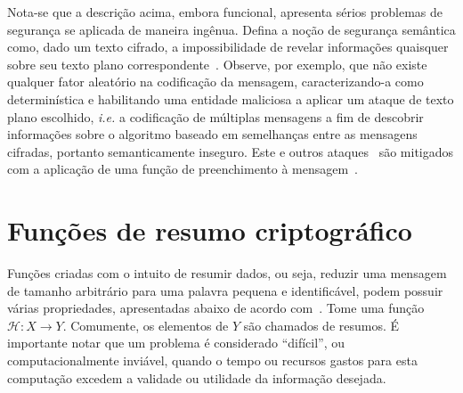 \documentclass{ufsctex/ufsctex}
\begin{document}
Nota-se que a descrição acima, embora funcional, apresenta sérios problemas de
segurança se aplicada de maneira ingênua. Defina a noção de segurança semântica
como, dado um texto cifrado, a impossibilidade de revelar informações quaisquer
sobre seu texto plano correspondente~\cite{Goldwasser:inproc:1982:may}.
Observe, por exemplo, que não existe qualquer fator aleatório na codificação da
mensagem, caracterizando-a como determinística e habilitando uma entidade
maliciosa a aplicar um ataque de texto plano escolhido, \emph{i.e.} a
codificação de múltiplas mensagens a fim de descobrir informações sobre o
algoritmo baseado em semelhanças entre as mensagens cifradas, portanto
semanticamente inseguro. Este e outros ataques~\cite{Boneh:article:1999:feb}
são mitigados com a aplicação de uma função de preenchimento à
mensagem~\cite{Bellare:inproc:1994:may}.

\section{Funções de resumo criptográfico}\label{section:hashfunc}

Funções criadas com o intuito de resumir dados, ou seja, reduzir uma mensagem
de tamanho arbitrário para uma palavra pequena e identificável, podem possuir
várias propriedades, apresentadas abaixo de acordo com~\cite[Seção
9.2]{Menezes:book:1996}. Tome uma função $\mathcal{H} : X \longrightarrow Y$.
Comumente, os elementos de $Y$ são chamados de resumos. É importante notar que
um problema é considerado ``difícil'', ou computacionalmente inviável, quando o
tempo ou recursos gastos para esta computação excedem a validade ou utilidade
da informação desejada.
\end{document}
